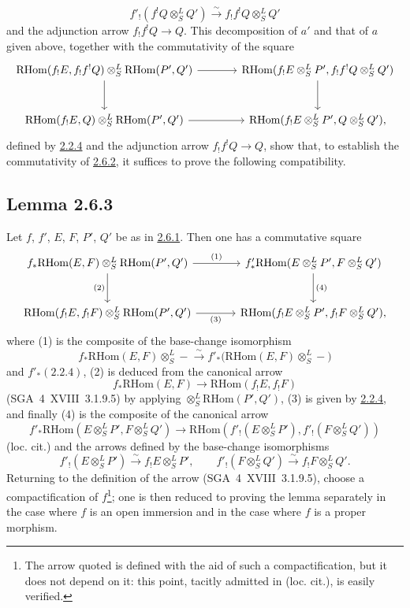 \documentclass[11pt]{article}
\providecommand{\RHom}{\mathrm{RHom}}
\providecommand{\RHom}{\mathrm{RHom}}
\providecommand{\RHom}{\mathrm R\mathcal{H}om}
\providecommand{\RHom}{\mathrm{RHom}}
\begin{document}
\[
f'_!(f^!Q\otimes^L_SQ')\xrightarrow{\sim}f_!f^!Q\otimes^L_SQ'
\]
and the adjunction arrow $f_!f^!Q\to Q$. This decomposition of $a'$ and that of $a$ given above, together with the commutativity of the square
\[
\begin{tikzcd}[column sep=large,row sep=large]
\RHom(f_!E,f_!f^!Q)\otimes^L_S\RHom(P',Q') \arrow[r] \arrow[d] & \RHom(f_!E\otimes^L_SP',f_!f^!Q\otimes^L_SQ') \arrow[d]\\
\RHom(f_!E,Q)\otimes^L_S\RHom(P',Q') \arrow[r] & \RHom(f_!E\otimes^L_SP',Q\otimes^L_SQ'),
\end{tikzcd}
\]
defined by \hyperref[sga5:III:equation:2.2.4]{2.2.4} and the adjunction arrow $f_!f^!Q\to Q$, show that, to establish the commutativity of \hyperref[sga5:III:equation:2.6.2]{2.6.2}, it suffices to prove the following compatibility.

\subsection*{Lemma 2.6.3}\label{sga5:III:lemma:2.6.3}
Let $f$, $f'$, $E$, $F$, $P'$, $Q'$ be as in \hyperref[sga5:III:corollary:2.6.1]{2.6.1}. Then one has a commutative square
\[
\begin{tikzcd}[column sep=large,row sep=large]
f_*\RHom(E,F)\otimes^L_S\RHom(P',Q') \arrow[r,"(1)"] \arrow[d,"(2)"'] & f'_*\RHom(E\otimes^L_SP',F\otimes^L_SQ') \arrow[d,"(4)"]\\
\RHom(f_!E,f_!F)\otimes^L_S\RHom(P',Q') \arrow[r,"(3)"'] & \RHom(f_!E\otimes^L_SP',f_!F\otimes^L_SQ'),
\end{tikzcd}
\]
where (1) is the composite of the base-change isomorphism
\[
f_*\RHom(E,F)\otimes^L_S -\xrightarrow{\sim}f'_*\bigl(\RHom(E,F)\otimes^L_S-\bigr)
\]
and $f'_*(\hyperref[sga5:III:equation:2.2.4]{2.2.4})$, (2) is deduced from the canonical arrow
\[
f_*\RHom(E,F)\longrightarrow\RHom(f_!E,f_!F)
\]
(SGA~4~XVIII~3.1.9.5) by applying $\otimes^L_S\RHom(P',Q')$, (3) is given by \hyperref[sga5:III:equation:2.2.4]{2.2.4}, and finally (4) is the composite of the canonical arrow
\[
f'_*\RHom(E\otimes^L_SP',F\otimes^L_SQ')
\longrightarrow
\RHom(f'_!(E\otimes^L_SP'),f'_!(F\otimes^L_SQ'))
\]
(loc. cit.) and the arrows defined by the base-change isomorphisms
\[
f'_!(E\otimes^L_SP')\xrightarrow{\sim}f_!E\otimes^L_SP',
\qquad
f'_!(F\otimes^L_SQ')\xrightarrow{\sim}f_!F\otimes^L_SQ'.
\]
Returning to the definition of the arrow (SGA~4~XVIII~3.1.9.5), choose a compactification of $f$\footnote{The arrow quoted is defined with the aid of such a compactification, but it does not depend on it: this point, tacitly admitted in (loc. cit.), is easily verified.}; one is then reduced to proving the lemma separately in the case where $f$ is an open immersion and in the case where $f$ is a proper morphism.
\end{document}
